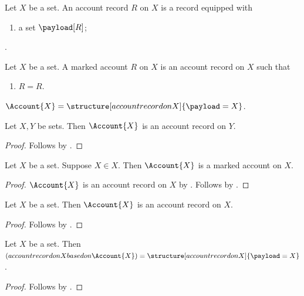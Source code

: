 \begin{struct}\label{account_record}
    Let $X$ be a set.
    An account record $R$ on $X$ is a record equipped with
    \begin{enumerate}
        \item a set $\payload[R]$;
    \end{enumerate}.
\end{struct}

\begin{struct}\label{account_marked}
    Let $X$ be a set.
    A marked account $R$ on $X$ is an account record on $X$ such that
    \begin{enumerate}
        \item\label{account_reflexive} $R=R$.
    \end{enumerate}
\end{struct}

\begin{definition}\label{account_provider}
    $\Account{X}=\structure[account record on X]{\payload=X}$.
\end{definition}

\begin{classification}\label{account_undetermined}
    Let $X,Y$ be sets.
    Then $\Account{X}$ is an account record on $Y$.
\end{classification}
\begin{proof}
    Follows by .
\end{proof}

\begin{classification}\label{account_failed}
    Let $X$ be a set.
    Suppose $X\in X$.
    Then $\Account{X}$ is a marked account on $X$.
\end{classification}
\begin{proof}
    $\Account{X}$ is an account record on $X$ by .
    Follows by .
\end{proof}

\begin{classification}\label{account_usable}
    Let $X$ be a set.
    Then $\Account{X}$ is an account record on $X$.
\end{classification}
\begin{proof}
    Follows by .
\end{proof}

\begin{proposition}\label{discovery_result}
    Let $X$ be a set.
    Then $(account record on X based on \Account{X})=
        \structure[account record on X]{\payload=X}$.
\end{proposition}
\begin{proof}
    Follows by .
\end{proof}

